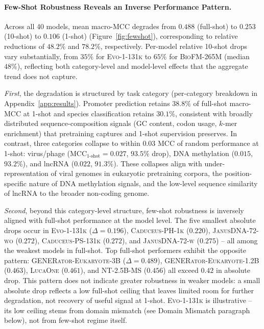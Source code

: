 \documentclass{llmxive}
\begin{document}
\paragraph{Few-Shot Robustness Reveals an Inverse Performance Pattern.}
Across all 40 models, mean macro-MCC degrades from $0.488$
(full-shot) to $0.253$ (10-shot) to $0.106$ (1-shot)
(Figure~\ref{fig:fewshot}), corresponding to relative reductions of
$48.2\%$ and $78.2\%$, respectively. Per-model relative 10-shot
drops vary substantially, from $35\%$ for \textsc{Evo-1-131k} to
$65\%$ for \textsc{BioFM-265M} (median $48\%$), reflecting both
category-level and model-level effects that the aggregate trend
does not capture.

\textit{First}, the degradation is structured by task category
(per-category breakdown in Appendix~\ref{app:results}). Promoter
prediction retains $38.8\%$ of full-shot macro-MCC at 1-shot and
species classification retains $30.1\%$, consistent with broadly
distributed sequence-composition signals (GC content, codon usage,
$k$-mer enrichment) that pretraining captures and 1-shot
supervision preserves. In contrast, three categories collapse to
within $0.03$ MCC of random performance at 1-shot: virus/phage
($\text{MCC}_{\text{1-shot}}=0.027$, $93.5\%$ drop), DNA methylation
($0.015$, $93.2\%$), and lncRNA ($0.022$, $91.3\%$). These collapses
align with under-representation of viral genomes in eukaryotic
pretraining corpora, the position-specific nature of DNA methylation
signals, and the low-level sequence similarity of lncRNA to the
broader non-coding genome.

\textit{Second}, beyond this category-level structure, few-shot
robustness is inversely aligned with full-shot performance at the
model level. The five smallest absolute drops occur in
\textsc{Evo-1-131k} ($\Delta = 0.196$), \textsc{Caduceus-PH-1k}
($0.220$), \textsc{JanusDNA-72-wo} ($0.272$),
\textsc{Caduceus-PS-131k} ($0.272$), and \textsc{JanusDNA-72-w}
($0.275$) -- all among the weakest models in full-shot. Top
full-shot performers exhibit the opposite pattern:
\textsc{GENERator-Eukaryote-3B} ($\Delta=0.489$),
\textsc{GENERator-Eukaryote-1.2B} ($0.463$), \textsc{LucaOne}
($0.461$), and \textsc{NT-2.5B-MS} ($0.456$) all exceed $0.42$ in
absolute drop. This pattern does not indicate greater robustness in
weaker models: a small absolute drop reflects a low full-shot
ceiling that leaves limited room for further degradation, not
recovery of useful signal at 1-shot. \textsc{Evo-1-131k} is
illustrative -- its low ceiling stems from domain mismatch
(see Domain Mismatch paragraph below), not from few-shot regime itself.
\end{document}
